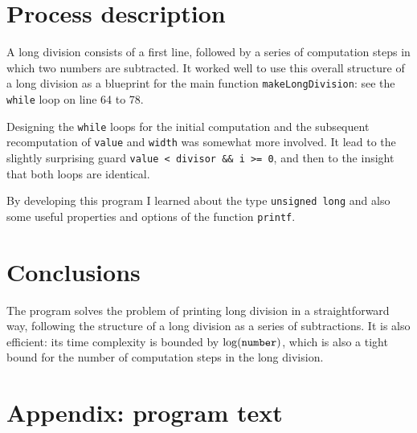 \documentclass[a4paper]{article}
\begin{document}
\section{Process description}

A long division consists of a first line, followed by a series of computation steps in which two numbers are subtracted.
It worked well to use this overall structure of a long division as a blueprint for the main function \verb!makeLongDivision!: see the \verb!while! loop on line 64 to 78.

Designing the \verb!while! loops for the initial computation and the subsequent recomputation of \verb!value! and \verb!width! was somewhat more involved.
It lead to the slightly surprising guard \verb!value < divisor && i >= 0!, and then to the insight that both loops are identical.

By developing this program I learned about the type \verb!unsigned long! and also some useful properties and options of the function \verb!printf!. 

\section{Conclusions}

The program solves the problem of printing long division in a straightforward way, following the structure of a long division as a series of subtractions.
It is also efficient: its time complexity is bounded by $\log(\verb!number!)$, which is also a tight bound for the number of computation steps in the long division.

\section{Appendix: program text}


\end{document}
